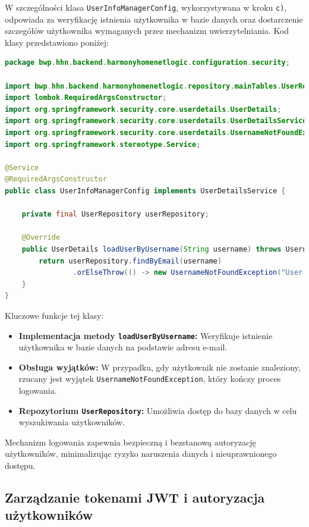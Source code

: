 W szczególności klasa \texttt{UserInfoManagerConfig}, wykorzystywana w kroku \texttt{c)}, odpowiada za weryfikację istnienia użytkownika w bazie danych oraz dostarczenie szczegółów użytkownika wymaganych przez mechanizm uwierzytelniania. Kod klasy przedstawiono poniżej:

\begin{lstlisting}[language=Java, style=JavaStyle, caption=Klasa \texttt{UserInfoManagerConfig} odpowiedzialna za zarządzanie użytkownikami]
package bwp.hhn.backend.harmonyhomenetlogic.configuration.security;

import bwp.hhn.backend.harmonyhomenetlogic.repository.mainTables.UserRepository;
import lombok.RequiredArgsConstructor;
import org.springframework.security.core.userdetails.UserDetails;
import org.springframework.security.core.userdetails.UserDetailsService;
import org.springframework.security.core.userdetails.UsernameNotFoundException;
import org.springframework.stereotype.Service;

@Service
@RequiredArgsConstructor
public class UserInfoManagerConfig implements UserDetailsService {

    private final UserRepository userRepository;

    @Override
    public UserDetails loadUserByUsername(String username) throws UsernameNotFoundException {
        return userRepository.findByEmail(username)
                .orElseThrow(() -> new UsernameNotFoundException("User not found"));
    }
}
\end{lstlisting}

Kluczowe funkcje tej klasy:
\begin{itemize}
    \item \textbf{Implementacja metody \texttt{loadUserByUsername}:} Weryfikuje istnienie użytkownika w bazie danych na podstawie adresu e-mail.
    \item \textbf{Obsługa wyjątków:} W przypadku, gdy użytkownik nie zostanie znaleziony, rzucany jest wyjątek \texttt{UsernameNotFoundException}, który kończy proces logowania.
    \item \textbf{Repozytorium \texttt{UserRepository}:} Umożliwia dostęp do bazy danych w celu wyszukiwania użytkowników.
\end{itemize}

Mechanizm logowania zapewnia bezpieczną i bezstanową autoryzację użytkowników, minimalizując ryzyko naruszenia danych i nieuprawnionego dostępu.

\subsection{Zarządzanie tokenami JWT i autoryzacja użytkowników}

